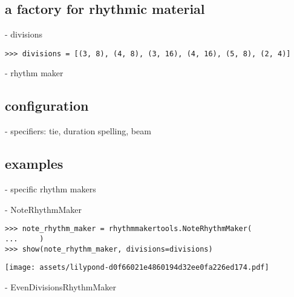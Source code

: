 \subsection{a factory for rhythmic material}

- divisions

\begin{comment}
<abjad>
divisions = [(3, 8), (4, 8), (3, 16), (4, 16), (5, 8), (2, 4)]
</abjad>
\end{comment}

\begin{singlespacing}
\begin{lstlisting}
>>> divisions = [(3, 8), (4, 8), (3, 16), (4, 16), (5, 8), (2, 4)]
\end{lstlisting}
\end{singlespacing}

- rhythm maker

\subsection{configuration}

- specifiers: tie, duration spelling, beam

\subsection{examples}

- specific rhythm makers

- NoteRhythmMaker

\begin{comment}
<abjad>
note_rhythm_maker = rhythmmakertools.NoteRhythmMaker(
    )
show(note_rhythm_maker, divisions=divisions)
</abjad>
\end{comment}

\begin{singlespacing}
\begin{lstlisting}
>>> note_rhythm_maker = rhythmmakertools.NoteRhythmMaker(
...     )
>>> show(note_rhythm_maker, divisions=divisions)
\end{lstlisting}
\texttt{[image: assets/lilypond-d0f66021e4860194d32ee0fa226ed174.pdf]}
\end{singlespacing}

- EvenDivisionsRhythmMaker

\begin{comment}
<abjad>
even_division_rhythm_maker = rhythmmakertools.EvenDivisionRhythmMaker(
    denominators=[8, 16, 4],
    )
show(even_division_rhythm_maker, divisions=divisions)
</abjad>
\end{comment}

